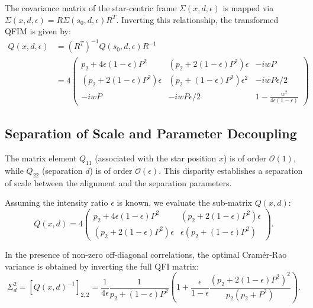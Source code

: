 The covariance matrix of the star-centric frame $\Sigma(x, d, \epsilon)$ is mapped via $\Sigma(x, d, \epsilon) = R \Sigma(s_0, d, \epsilon) R^T$. Inverting this relationship, the transformed QFIM is given by:
\begin{equation}
    \begin{split}
        Q(x, d, \epsilon) & = (R^T)^{-1} Q(s_0, d, \epsilon) R^{-1}
        \\
                          & = 4 \begin{pmatrix}
                                    p_2 + 4\epsilon(1-\epsilon)P^2   & (p_2 + 2(1-\epsilon)P^2)\epsilon  & -iwP                                  \\
                                    (p_2 + 2(1-\epsilon)P^2)\epsilon & (p_2 + (1-\epsilon)P^2)\epsilon^2 & -iwP\epsilon/2                        \\
                                    -iwP                             & -iwP\epsilon/2                    & 1 - \frac{w^2}{4\epsilon(1-\epsilon)}
                                \end{pmatrix}
    \end{split}
    \label{eq:transformed_qfim_link}
\end{equation}

\subsection{Separation of Scale and Parameter Decoupling}
The matrix element $Q_{11}$ (associated with the star position $x$) is of order $\mathcal{O}(1)$, while $Q_{22}$ (separation $d$) is of order $\mathcal{O}(\epsilon)$. This disparity establishes a separation of scale between the alignment and the separation parameters.

Assuming the intensity ratio $\epsilon$ is known, we evaluate the sub-matrix $Q(x,d)$:
\begin{equation}
    Q(x, d) = 4 \begin{pmatrix}
        p_2 + 4\epsilon(1-\epsilon)P^2   & (p_2 + 2(1-\epsilon)P^2)\epsilon \\
        (p_2 + 2(1-\epsilon)P^2)\epsilon & \epsilon(p_2 + (1-\epsilon)P^2)
    \end{pmatrix}.
\end{equation}

In the presence of non-zero off-diagonal correlations, the optimal Cram\'{e}r-Rao variance is obtained by inverting the full QFI matrix:
\begin{equation}
    \Sigma^2_d = [Q(x,d)^{-1}]_{2,2} = \frac{1}{4\epsilon} \frac{1}{p_2 + (1-\epsilon)P^2} \left( 1 + \frac{\epsilon}{1-\epsilon} \frac{(p_2 + 2(1-\epsilon)P^2)^2}{p_2(p_2 + P^2)} \right).
    \label{eq:crb_full_link}
\end{equation}

